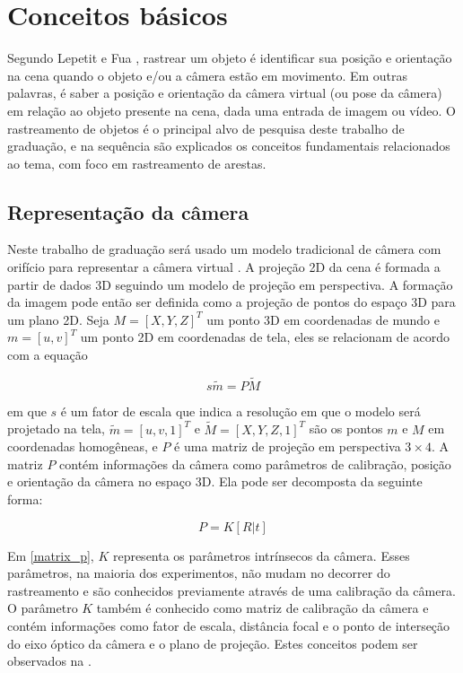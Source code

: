 \chapter{Conceitos básicos}

Segundo Lepetit e Fua \cite{lepetit}, rastrear um objeto é identificar sua posição e orientação na cena quando o objeto e/ou a câmera estão em movimento. Em outras palavras, é saber a posição e orientação da câmera virtual (ou pose da câmera) em relação ao objeto presente na cena, dada uma entrada de imagem ou vídeo. O rastreamento de objetos é o principal alvo de pesquisa deste trabalho de graduação, e na sequência são explicados os conceitos fundamentais relacionados ao tema, com foco em rastreamento de arestas.

\section{Representação da câmera}

Neste trabalho de graduação será usado um modelo tradicional de câmera com orifício para representar a câmera virtual \cite{hartley}. A projeção 2D da cena é formada a partir de dados 3D seguindo um modelo de projeção em perspectiva. A formação da imagem pode então ser definida como a projeção de pontos do espaço 3D para um plano 2D. Seja $M = [X, Y, Z]^T$ um ponto 3D em coordenadas de mundo e $m = [u, v]^T$ um ponto 2D em coordenadas de tela, eles se relacionam de acordo com a equação

\begin{equation}
\label{projection_eq}
s\tilde{m} = P\tilde{M}
\end{equation}

\noindent
em que $s$ é um fator de escala que indica a resolução em que o modelo será projetado na tela, $\tilde{m} = [u, v, 1]^T$ e $\tilde{M} = [X, Y, Z, 1]^T$ são os pontos $m$ e $M$ em coordenadas homogêneas, e $P$ é uma matriz de projeção em perspectiva $3 \times 4$. A matriz $P$ contém informações da câmera como parâmetros de calibração, posição e orientação da câmera no espaço 3D. Ela pode ser decomposta da seguinte forma:

\begin{equation}
\label{matrix_p}
P = K[R | t]
\end{equation}

Em \eqref{matrix_p}, $K$ representa os parâmetros intrínsecos da câmera. Esses parâmetros, na maioria dos experimentos, não mudam no decorrer do rastreamento e são conhecidos previamente através de uma calibração da câmera. O parâmetro $K$ também é conhecido como matriz de calibração da câmera \cite{lepetit} e contém informações como fator de escala, distância focal e o ponto de interseção do eixo óptico da câmera e o plano de projeção. Estes conceitos podem ser observados na .

